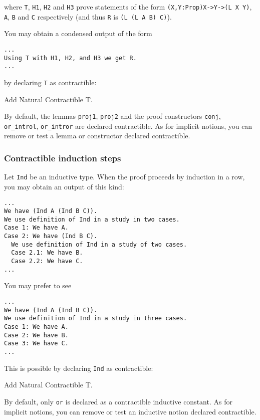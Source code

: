 where \verb=T=, \verb=H1=, \verb=H2= and \verb=H3= prove statements
of the form \verb=(X,Y:Prop)X->Y->(L X Y)=, \verb=A=, \verb=B= and \verb=C=
respectively (and thus \verb=R= is \verb=(L (L A B) C)=).

You may obtain a condensed output of the form

\begin{verbatim}
...
Using T with H1, H2, and H3 we get R.
...
\end{verbatim}

by declaring \verb=T= as contractible:

\begin{coq_example*}
Add Natural Contractible T.
\end{coq_example*}

By default, the lemmas \verb=proj1=, \verb=proj2= and the proof
constructors \verb=conj=, \verb=or_introl=, \verb=or_intror= are
declared contractible. As for implicit notions, you can remove or
test a lemma or constructor declared contractible.

\subsubsection*{Contractible induction steps}

Let \verb=Ind= be an inductive type. When the proof proceeds by
induction in a row, you may obtain an output of this kind:

\begin{verbatim}
...
We have (Ind A (Ind B C)).
We use definition of Ind in a study in two cases.
Case 1: We have A.
Case 2: We have (Ind B C).
  We use definition of Ind in a study of two cases.
  Case 2.1: We have B.
  Case 2.2: We have C.
...
\end{verbatim}

You may prefer to see

\begin{verbatim}
...
We have (Ind A (Ind B C)).
We use definition of Ind in a study in three cases.
Case 1: We have A.
Case 2: We have B.
Case 3: We have C.
...
\end{verbatim}

This is possible by declaring \verb=Ind= as contractible:

\begin{coq_example*}
Add Natural Contractible T.
\end{coq_example*}

By default, only \verb=or= is declared as a contractible inductive
constant.
As for implicit notions, you can remove or test an inductive notion declared
contractible.

